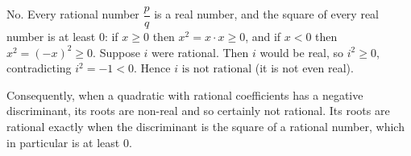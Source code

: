 No. Every rational number $\dfrac {p}{q}$ is a real number, and the square of every real number is at least $0$: if $x\ge0$ then $x^2=x\cdot x\ge0$, and if $x<0$ then $x^2=(-x)^2\ge0$. Suppose $i$ were rational. Then $i$ would be real, so $i^2\ge0$, contradicting $i^2=-1<0$. Hence $\boxed{i\text{ is not rational}}$ (it is not even real).

Consequently, when a quadratic with rational coefficients has a negative discriminant, its roots are non-real and so certainly not rational. Its roots are rational exactly when the discriminant is the square of a rational number, which in particular is at least $0$.
